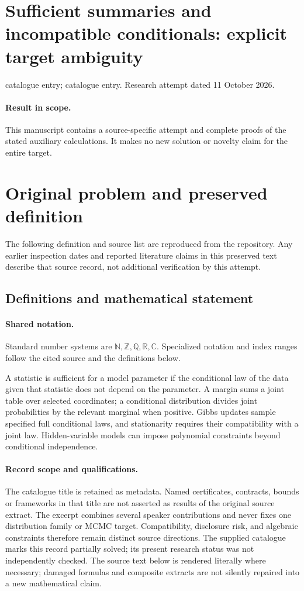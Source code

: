 \documentclass[11pt]{article}
\begin{document}
\section*{Sufficient summaries and incompatible conditionals: explicit target ambiguity}
\noindent catalogue entry; catalogue entry. Research attempt dated 11 October 2026.
\paragraph{Result in scope.}This manuscript contains a source-specific attempt and complete proofs of the stated auxiliary calculations. It makes no new solution or novelty claim for the entire target.
\section{Original problem and preserved definition}
The following definition and source list are reproduced from the repository. Any earlier inspection dates and reported literature claims in this preserved text describe that source record, not additional verification by this attempt.
\subsection{Definitions and mathematical statement}

\paragraph{Shared notation.}Standard number systems are $\mathbb N,\mathbb Z,\mathbb Q,\mathbb R,\mathbb C$. Specialized notation and index ranges follow the cited source and the definitions below.


A statistic is sufficient for a model parameter if the conditional law of the data given that statistic does not depend on the parameter. A margin sums a joint table over selected coordinates; a conditional distribution divides joint probabilities by the relevant marginal when positive. Gibbs updates sample specified full conditional laws, and stationarity requires their compatibility with a joint law. Hidden-variable models can impose polynomial constraints beyond conditional independence.
\paragraph{Record scope and qualifications.}
The catalogue title is retained as metadata. Named certificates, contracts, bounds or frameworks in that title are not asserted as results of the original source extract.
The excerpt combines several speaker contributions and never fixes one distribution family or MCMC target. Compatibility, disclosure risk, and algebraic constraints therefore remain distinct source directions. The supplied catalogue marks this record partially solved; its present research status was not independently checked.
The source text below is rendered literally where necessary; damaged formulas and composite extracts are not silently repaired into a new mathematical claim.
\end{document}

